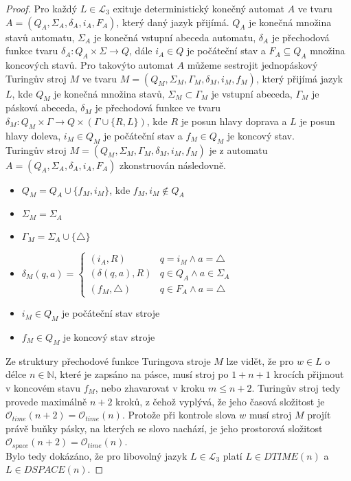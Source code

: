 \documentclass[a4paper, 11pt, fleqn]{scrartcl}
\begin{document}
   \begin{proof}
     Pro každý $L \in \mathcal{L}_3$ exituje deterministický konečný automat $A$ ve tvaru $A = (Q_A, \Sigma_A, \delta_A, i_A, F_A)$, který daný jazyk přijímá. $Q_A$ je konečná množina stavů automatu, $\Sigma_A$ je konečná vstupní abeceda automatu, $\delta_A$ je přechodová funkce tvaru $\delta_A: Q_A \times \Sigma \longrightarrow Q$, dále $i_A \in Q$ je počáteční stav a $F_A \subseteq Q_A$ množina koncových stavů. Pro takovýto automat $A$ můžeme sestrojit jednopáskový Turingův stroj $M$ ve tvaru $M = (Q_M, \Sigma_M, \Gamma_M, \delta_M, i_M, f_M)$, který přijímá jazyk $L$, kde $Q_M$ je konečná množina stavů, $\Sigma_M \subset \Gamma_M$ je vstupní abeceda, $\Gamma_M$ je pásková abeceda, $\delta_M$ je přechodová funkce ve tvaru $\delta_M: Q_M \times \Gamma \longrightarrow Q \times (\Gamma \cup \{R, L\})$, kde $R$ je posun hlavy doprava a $L$ je posun hlavy doleva, $i_M \in Q_M$ je počáteční stav a $f_M \in Q_M$ je koncový stav.\\

     Turingův stroj $M = (Q_M, \Sigma_M, \Gamma_M, \delta_M, i_M, f_M)$ je z automatu $A = (Q_A, \Sigma_A, \delta_A, i_A, F_A)$ zkonstruován následovně.
     \begin{itemize}
       \item $Q_M = Q_A \cup \{f_M, i_M\}$, kde $f_M, i_M \notin Q_A$
       \item $\Sigma_M = \Sigma_A$
       \item $\Gamma_M = \Sigma_A \cup \{\triangle\}$
       \item $\delta_M(q, a) =
       \begin{cases}
         (i_A, R) & q = i_M \land a = \triangle\\
         (\delta(q, a), R) & q \in Q_A \land a \in \Sigma_A \\
         (f_M, \triangle)  & q \in F_A \land a = \triangle
       \end{cases}
       $
       \item $i_M \in Q_M$ je počáteční stav stroje
       \item $f_M \in Q_M$ je koncový stav stroje
     \end{itemize}

     Ze struktury přechodové funkce Turingova stroje $M$ lze vidět, že pro $w \in L$ o délce $n \in \mathbb{N}$, které je zapsáno na pásce, musí stroj po $1+n+1$ krocích přijmout v koncovém stavu $f_M$, nebo zhavarovat v kroku $m \leq n+2$. Turingův stroj tedy provede maximálně $n+2$ kroků, z čehož vyplývá, že jeho časová složitost je $\mathcal{O}_{time}(n+2) = \mathcal{O}_{time}(n)$. Protože při kontrole slova $w$ musí stroj $M$ projít právě buňky pásky, na kterých se slovo nachází, je jeho prostorová složitost $\mathcal{O}_{space}(n+2) = \mathcal{O}_{time}(n)$.\\

     Bylo tedy dokázáno, že pro libovolný jazyk $L \in \mathcal{L}_3$ platí $L \in \textit{DTIME}(n)$ a $L \in \textit{DSPACE}(n)$.
   \end{proof}
\end{document}

